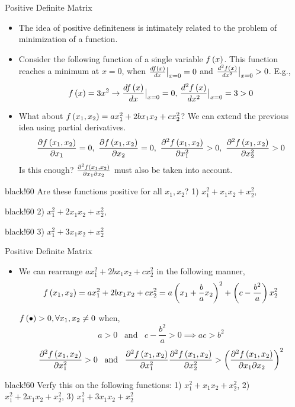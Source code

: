 \documentclass[aspectratio=169]{beamer}
\def\lp{\ensuremath\left(}
\def\rp{\ensuremath\right)}
\newcommand{\demoex}[2]{\onslide<#1->\begin{color}{black!60} #2 \end{color}}
\begin{document}
\begin{frame}[t]{Positive Definite Matrix}
\vspace{-0.4cm}
\begin{small}
\begin{itemize}
    \item The idea of positive definiteness is intimately related to the problem of minimization of a function.

    \item Consider the following  function of a single variable $f\lp x\rp$. This function reaches a minimum at $x = 0$, when $\frac{df\lp x\rp}{dx} \big\rvert_{x=0} = 0$ and $\frac{d^2f\lp x\rp}{dx^2} \big\rvert_{x=0} > 0$. E.g.,
    $$f\lp x\rp = 3x^2 \rightarrow \frac{df\lp x\rp}{dx} \big\rvert_{x=0} = 0, \,\frac{d^2f\lp x\rp}{dx^2} \big\rvert_{x=0}  = 3 > 0$$

    \item What about $f\lp x_1, x_2 \rp = ax_1^2 + 2bx_1x_2 + cx_2^2$? We can extend the previous idea using partial derivatives.
    \[ \frac{\partial f\lp x_1, x_2 \rp}{\partial x_1} = 0, \,\, \frac{\partial f\lp x_1, x_2 \rp}{\partial x_2} = 0, \,\, \frac{\partial^2 f\lp x_1, x_2 \rp}{\partial x_1^2} > 0, \,\, \frac{\partial^2 f\lp x_1, x_2 \rp}{\partial x_2^2} > 0 \]
    Is this enough? $\frac{\partial^2f\lp x_1, x_2\rp}{\partial x_1 \partial x_2}$ must also be taken into account.
\end{itemize}

\demoex{2}{
    Are these functions positive for all $x_1, x_2$? 1) $x_1^2 + x_1x_2 + x_2^2$,\hspace{0.1cm}
}
\demoex{3}{
    2) $x_1^2 + 2x_1x_2 + x_2^2$,\hspace{0.1cm}
}
\demoex{4}{
    3) $x_1^2 + 3x_1x_2 + x_2^2$
}
\end{small}
\end{frame}


\begin{frame}[t]{Positive Definite Matrix}
\begin{itemize}
    \item We can rearrange $ax_1^2 + 2bx_1x_2 + cx_2^2$ in the following manner,
    \[ f\lp x_1, x_2 \rp = ax_1^2 + 2bx_1x_2 + cx_2^2 = a\lp x_1 + \frac{b}{a}x_2\rp^2 + \lp c - \frac{b^2}{a}\rp x_2^2 \]

    $f\lp\bullet\rp > 0, \forall x_1, x_2 \neq 0$ when,
    \[ a > 0\,\,\,\text{ and }\,\,\,c - \frac{b^2}{a} > 0 \implies ac > b^2 \]
    \[ \frac{\partial^2f\lp x_1, x_2 \rp}{\partial x_1^2} > 0\,\,\,\text{ and }\,\,\,\frac{\partial^2f\lp x_1, x_2 \rp}{\partial x_1^2} \frac{\partial^2f\lp x_1, x_2 \rp}{\partial x_2^2} > \lp\frac{\partial^2 f\lp x_1, x_2 \rp}{\partial x_1 \partial x_2}\rp^2 \]
\end{itemize}
\vspace{0.3cm}

\demoex{2}{
    Verfy this on the following functions: 1) $x_1^2 + x_1x_2 + x_2^2$,\hspace{0.1cm} 2) $x_1^2 + 2x_1x_2 + x_2^2$,\hspace{0.1cm} 3) $x_1^2 + 3x_1x_2 + x_2^2$
}
\end{frame}
\end{document}
